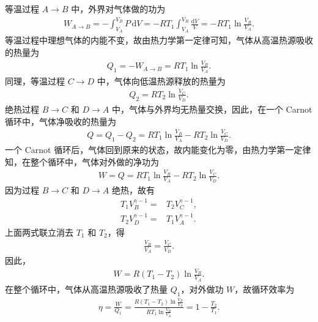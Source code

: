 \documentclass{assignment}
\begin{document}
\begin{pf}
    等温过程 $A\rightarrow B$ 中，外界对气体做的功为
    \begin{align}
        W_{A\rightarrow B}=-\int_{V_A}^{V_B}P\,\mathrm{d}V=-RT_1\int_{V_A}^{V_B}\frac{\mathrm{d}V}{V}=-RT_1\ln\frac{V_B}{V_A}.
    \end{align}
    等温过程中理想气体的内能不变，故由热力学第一定律可知，气体从高温热源吸收的热量为
    \begin{align}
        Q_1=-W_{A\rightarrow B}=RT_1\ln\frac{V_B}{V_A}.
    \end{align}
    同理，等温过程 $C\rightarrow D$ 中，气体向低温热源释放的热量为
    \begin{align}
        Q_2=RT_2\ln\frac{V_C}{V_D}.
    \end{align}
    绝热过程 $B\rightarrow C$ 和 $D\rightarrow A$ 中，气体与外界均无热量交换，因此，在一个 Carnot 循环中，气体净吸收的热量为
    \begin{align}
        Q=Q_1-Q_2=RT_1\ln\frac{V_B}{V_A}-RT_2\ln\frac{V_C}{V_D}.
    \end{align}
    一个 Carnot 循环后，气体回到原来的状态，故内能变化为零，由热力学第一定律知，在整个循环中，气体对外做的净功为
    \begin{align}
        W=Q=RT_1\ln\frac{V_B}{V_A}-RT_2\ln\frac{V_C}{V_D}.
    \end{align}
    因为过程 $B\rightarrow C$ 和 $D\rightarrow A$ 绝热，故有
    \begin{align}
        T_1V_B^{\gamma-1}=&T_2V_C^{\gamma-1},\\
        T_2V_D^{\gamma-1}=&T_1V_A^{\gamma-1}.
    \end{align}
    上面两式联立消去 $T_1$ 和 $T_2$，得
    \begin{align}
        \frac{V_B}{V_A}=\frac{V_C}{V_D}.
    \end{align}
    因此，
    \begin{align}
        W=R(T_1-T_2)\ln\frac{V_B}{V_A}.
    \end{align}
    在整个循环中，气体从高温热源吸收了热量 $Q_1$，对外做功 $W$，故循环效率为
    \begin{align}
        \eta=\frac{W}{Q_1}=\frac{R(T_1-T_2)\ln\frac{V_B}{V_A}}{RT_1\ln\frac{V_B}{V_A}}=1-\frac{T_2}{T_1}.
    \end{align}
\end{pf}
\end{document}
